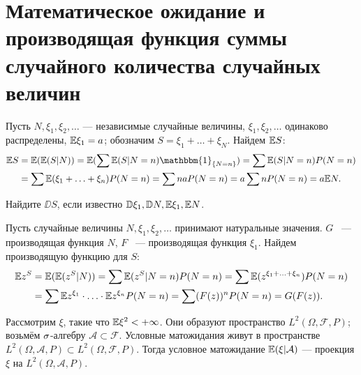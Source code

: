 \section{Математическое ожидание и производящая функция суммы случайного количества случайных величин}

\begin{example}
    Пусть $N, \xi_1, \xi_2, \ldots$ --- независимые случайные величины, $\xi_1, \xi_2, \ldots$ одинаково распределены, $\mathbb{E} \xi_1 = a$; обозначим
    $S = \xi_1 + \ldots + \xi_N$. Найдем $\mathbb{E} S$:
    \begin{align*}
        \EE S &= \EE (\EE (S | N)) = \EE (\sum \EE (S | N = n)\mathbbm{1}_{\{N = n\}}) = \sum \EE (S | N = n) P(N = n) \\&= \sum \EE (\xi_1 + \ldots + \xi_n) P(N = n) = \sum na P(N = n) =
        a\sum nP(N= n) = a\EE N.
    \end{align*}

\end{example}

\begin{exercise}
    Найдите $\DD S$, если известно $\mathbb{D}\xi_1, \mathbb{D} N, \mathbb{E} \xi_1, \mathbb{E} N$.
\end{exercise}

\begin{example}
   Пусть случайные величины $N, \xi_1, \xi_2, \ldots$ принимают натуральные значения.
    $G$ ~--- производящая функция $N$, $F$ ~--- производящая функция $\xi_1$. Найдем производящую функцию для $S$:
    \begin{align*}
        \mathbb{E} z^S &= \mathbb{E} (\mathbb{E} (z^S | N)) = \sum \mathbb{E} (z^S | N = n)P(N = n) = \sum \mathbb{E} (z^{\xi_1 + \ldots + \xi_n}) P(N = n) \\&=
        \sum \mathbb{E} z^{\xi_1}\cdot\ldots\cdot \mathbb{E} z^{\xi_n} P(N = n) = \sum (F(z))^n P(N= n) = G(F(z)).
    \end{align*}
   
\end{example}

\begin{remark}
Рассмотрим $\xi$, такие что $\mathbb{E} \xi^2 < +\infty$. Они образуют пространство $L^2(\Omega, \mathcal{F}, P)$; возьмём $\sigma$-алгебру $\mathcal{A} \subset\mathcal{F}$. Условные матожидания живут в пространстве $L^2(\Omega, \mathcal{A}, P)\subset L^2(\Omega, \mathcal{F}, P)$. Тогда 
условное матожидание $\mathbb{E} (\xi |\mathcal{A} )$ --- проекция $\xi$ на $L^2(\Omega, \mathcal{A}, P)$.
\end{remark}


